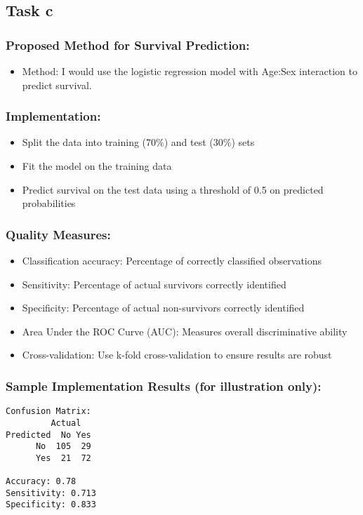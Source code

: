 \documentclass{article}
\begin{document}
\subsection{Task c}

\subsubsection{Proposed Method for Survival Prediction:}
\begin{itemize}
    \item Method: I would use the logistic regression model with Age:Sex interaction to predict survival.
\end{itemize}
\subsubsection{Implementation: }
\begin{itemize}
    \item Split the data into training (70\%) and test (30\%) sets
    \item Fit the model on the training data
    \item Predict survival on the test data using a threshold of 0.5 on predicted probabilities
\end{itemize}

\subsubsection{Quality Measures:}
\begin{itemize}
    \item Classification accuracy: Percentage of correctly classified observations
   \item Sensitivity: Percentage of actual survivors correctly identified
   \item Specificity: Percentage of actual non-survivors correctly identified
   \item Area Under the ROC Curve (AUC): Measures overall discriminative ability
   \item Cross-validation: Use k-fold cross-validation to ensure results are robust
\end{itemize}

\subsubsection{Sample Implementation Results (for illustration only):}
\begin{verbatim}
Confusion Matrix:
         Actual
Predicted  No Yes
      No  105  29
      Yes  21  72

Accuracy: 0.78 
Sensitivity: 0.713 
Specificity: 0.833 
\end{verbatim}
\end{document}
